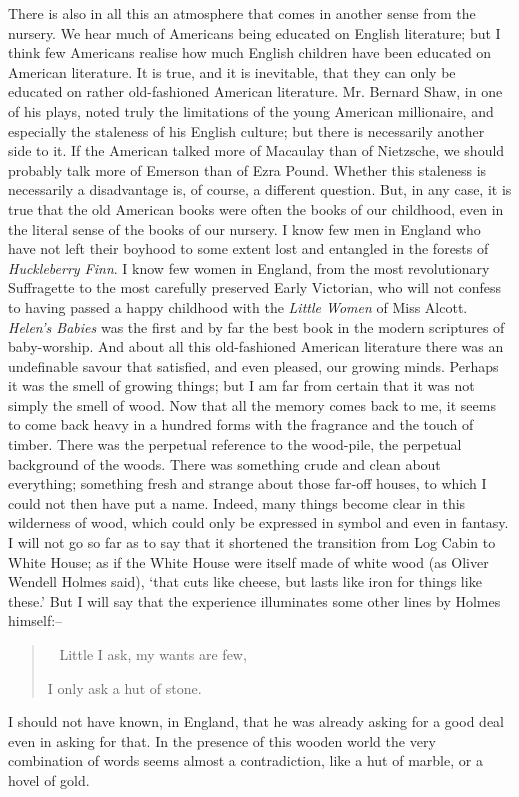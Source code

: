 \documentclass{book}
\newenvironment{mdblockquote}{%
  \begin{quotation}
    \
}{%
  \end{quotation}
}
\begin{document}
There is also in all this an atmosphere that comes in another sense from the nursery. We hear much of Americans being educated on English literature; but I think few Americans realise how much English children have been educated on American literature. It is true, and it is inevitable, that they can only be educated on rather old-fashioned American literature. Mr. Bernard Shaw, in one of his plays, noted truly the limitations of the young American millionaire, and especially the staleness of his English culture; but there is necessarily another side to it. If the American talked more of Macaulay than of Nietzsche, we should probably talk more of Emerson than of Ezra Pound. Whether this staleness is necessarily a disadvantage is, of course, a different question. But, in any case, it is true that the old American books were often the books of our childhood, even in the literal sense of the books of our nursery. I know few men in England who have not left their boyhood to some extent lost and entangled in the forests of \emph{Huckleberry Finn}. I know few women in England, from the most revolutionary Suffragette to the most carefully preserved Early Victorian, who will not confess to having passed a happy childhood with the \emph{Little Women} of Miss Alcott. \emph{Helen’s Babies} was the first and by far the best book in the modern scriptures of baby-worship. And about all this old-fashioned American literature there was an undefinable savour that satisfied, and even pleased, our growing minds. Perhaps it was the smell of growing things; but I am far from certain that it was not simply the smell of wood. Now that all the memory comes back to me, it seems to come back heavy in a hundred forms with the fragrance and the touch of timber. There was the perpetual reference to the wood-pile, the perpetual background of the woods. There was something crude and clean about everything; something fresh and strange about those far-off houses, to which I could not then have put a name. Indeed, many things become clear in this wilderness of wood, which could only be expressed in symbol and even in fantasy. I will not go so far as to say that it shortened the transition from Log Cabin to White House; as if the White House were itself made of white wood (as Oliver Wendell Holmes said), ‘that cuts like cheese, but lasts like iron for things like these.’ But I will say that the experience illuminates some other lines by Holmes himself:–

\begin{mdblockquote}
	Little I ask, my wants are few,

	I only ask a hut of stone.


\end{mdblockquote}
I should not have known, in England, that he was already asking for a good deal even in asking for that. In the presence of this wooden world the very combination of words seems almost a contradiction, like a hut of marble, or a hovel of gold.
\end{document}
